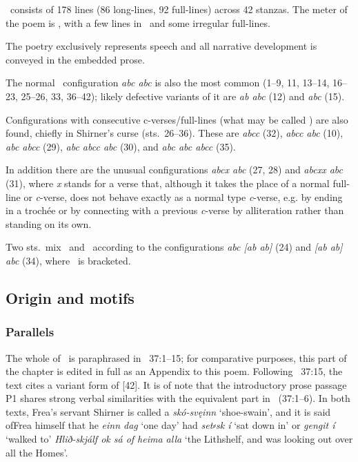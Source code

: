 \Skirnismal\ consists of 178 lines (86 long-lines, 92 full-lines) across 42 stanzas.
The meter of the poem is \Ljodahattr, with a few lines in \Malahattr\ and some irregular full-lines.

The poetry exclusively represents speech and all narrative development is conveyed in the embedded prose.

The normal \Ljodahattr\ configuration \emph{abc abc} is also the most common (1--9, 11, 13--14, 16--23, 25--26, 33, 36--42); likely defective variants of it are \emph{ab abc} (12) and \emph{abc} (15).

Configurations with consecutive c-verses/full-lines (what may be called \Galdralag) are also found, chiefly in Shirner’s curse (sts.~26--36).  These are \emph{abcc} (32), \emph{abcc abc} (10), \emph{abc abcc} (29), \emph{abc abcc abc} (30), and \emph{abc abc abcc} (35).

In addition there are the unusual configurations \emph{abcx abc} (27, 28) and \emph{abcxx abc} (31), where \emph{x} stands for a verse that, although it takes the place of a normal full-line or \emph{c}-verse, does not behave exactly as a normal type \emph{c}-verse, e.g. by ending in a trochée or by connecting with a previous \emph{c}-verse by alliteration rather than standing on its own.

Two sts.~mix \Malahattr\ and \Ljodahattr\ according to the configurations \emph{abc [ab ab]} (24) and \emph{[ab ab] abc} (34), where \Malahattr\ is bracketed.

\subsection{Origin and motifs}

\subsubsection{Parallels}

The whole of \Skirnismal\ is paraphrased in \Gylfaginning~37:1--15; for comparative purposes, this part of the chapter is edited in full as an Appendix to this poem.  Following \Gylfaginning~37:15, the text cites a variant form of [42].
It is of note that the introductory prose passage P1 shares strong verbal similarities with the equivalent part in \Gylfaginning\ (37:1--6).  In both texts, Frea’s servant Shirner is called a \emph{skó-svęinn} ‘shoe-swain’, and it is said ofFrea himself that he \emph{einn dag} ‘one day’ had \emph{set⸗sk í} ‘sat down in’ or \emph{gengit í} ‘walked to’ \emph{Hlið-skjálf ok sá of heima alla} ‘the Lithshelf, and was looking out over all the Homes’.

